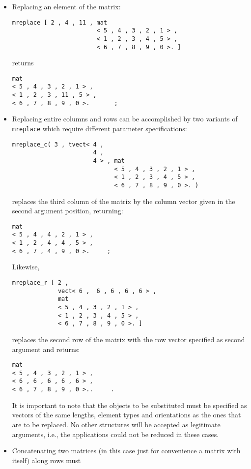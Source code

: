 \begin{itemize}
\item Replacing an element of the matrix:
\begin{verbatim}
mreplace [ 2 , 4 , 11 , mat 
                        < 5 , 4 , 3 , 2 , 1 > ,
                        < 1 , 2 , 3 , 4 , 5 > ,
                        < 6 , 7 , 8 , 9 , 0 >. ]
\end{verbatim}
returns
\begin{verbatim}
mat 
< 5 , 4 , 3 , 2 , 1 > ,
< 1 , 2 , 3 , 11 , 5 > ,
< 6 , 7 , 8 , 9 , 0 >.       ;
\end{verbatim}
\item Replacing entire columns and rows can be accomplished
by two variants of {\tt mreplace} which require different
parameter specifications:
\begin{verbatim}
mreplace_c( 3 , tvect< 4 ,
                       4 ,
                       4 > , mat 
                             < 5 , 4 , 3 , 2 , 1 > ,
                             < 1 , 2 , 3 , 4 , 5 > ,
                             < 6 , 7 , 8 , 9 , 0 >. )       
\end{verbatim}
replaces the third column of the matrix by the column vector
given in the second argument position, returning:
\begin{verbatim}
mat 
< 5 , 4 , 4 , 2 , 1 > ,
< 1 , 2 , 4 , 4 , 5 > ,
< 6 , 7 , 4 , 9 , 0 >.     ;
\end{verbatim}
Likewise,
\begin{verbatim}
mreplace_r [ 2 ,
             vect< 6 ,  6 , 6 , 6 , 6 > ,
             mat 
             < 5 , 4 , 3 , 2 , 1 > ,
             < 1 , 2 , 3 , 4 , 5 > ,
             < 6 , 7 , 8 , 9 , 0 >. ]
\end{verbatim}
replaces the second row of the matrix with the row vector
specified as second argument and returns:
\begin{verbatim}
mat 
< 5 , 4 , 3 , 2 , 1 > ,
< 6 , 6 , 6 , 6 , 6 > ,
< 6 , 7 , 8 , 9 , 0 >..     .
\end{verbatim}
It is important to note that the objects to be substituted must be specified as vectors of the same lengths, element types
and orientations as the ones that are to be replaced. No other
structures will be accepted as legitimate arguments, i.e., the
applications could not be reduced in these cases.
\item Concatenating two matrices (in this case just for convenience a matrix with itself) along rows must

\end{itemize}
